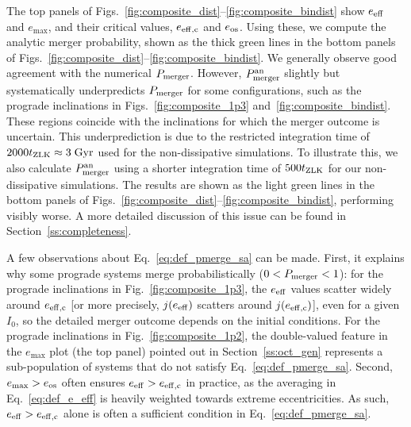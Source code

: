 \documentclass[
        fleqn,
        usenatbib,
    ]{mnras}
\begin{document}
The top panels of Figs.~\ref{fig:composite_dist}--\ref{fig:composite_bindist}
show $e_{\rm eff}$ and $e_{\max}$, and their critical values, $e_{\rm eff, c}$
and $e_{\rm os}$. Using these, we compute the analytic merger probability, shown
as the thick green lines in the bottom panels of
Figs.~\ref{fig:composite_dist}--\ref{fig:composite_bindist}. We generally
observe good agreement with the numerical $P_{\rm merger}$. However, $P_{\rm
merger}^{\rm an}$ slightly but systematically underpredicts $P_{\rm merger}$ for
some configurations, such as the prograde inclinations in
Figs.~\ref{fig:composite_1p3} and~\ref{fig:composite_bindist}. These regions
coincide with the inclinations for which the merger outcome is uncertain. This
underprediction is due to the restricted integration time of $2000 t_{\rm ZLK}
\approx 3\;\mathrm{Gyr}$ used for the non-dissipative simulations. To illustrate
this, we also calculate $P_{\rm merger}^{\rm an}$ using a shorter integration
time of $500 t_{\rm ZLK}$ for our non-dissipative simulations. The results are
shown as the light green lines in the bottom panels of
Figs.~\ref{fig:composite_dist}--\ref{fig:composite_bindist}, performing visibly
worse. A more detailed discussion of this issue can be found in
Section~\ref{ss:completeness}.

A few observations about Eq.~\eqref{eq:def_pmerge_sa} can be made. First, it
explains why some prograde systems merge probabilistically ($0 < P_{\rm merger}
< 1$): for the prograde inclinations in Fig.~\ref{fig:composite_1p3},
the $e_{\rm eff}$ values scatter widely around $e_{\rm eff,c}$ [or more
precisely, $j(e_{\rm eff})$ scatters around $j(e_{\rm eff,c})$], even for a
given $I_0$, so the detailed merger outcome depends on the initial conditions.
For the prograde inclinations in Fig.~\ref{fig:composite_1p2}, the double-valued
feature in the $e_{\max}$ plot (the top panel) pointed out in
Section~\ref{ss:oct_gen} represents a sub-population of systems that do not
satisfy Eq.~\eqref{eq:def_pmerge_sa}. Second, $e_{\max} > e_{\rm os}$ often
ensures $e_{\rm eff} > e_{\rm eff, c}$ in practice, as the averaging in
Eq.~\eqref{eq:def_e_eff} is heavily weighted towards extreme eccentricities. As
such, $e_{\rm eff} > e_{\rm eff, c}$ alone is often a sufficient condition in
Eq.~\eqref{eq:def_pmerge_sa}.
\end{document}
